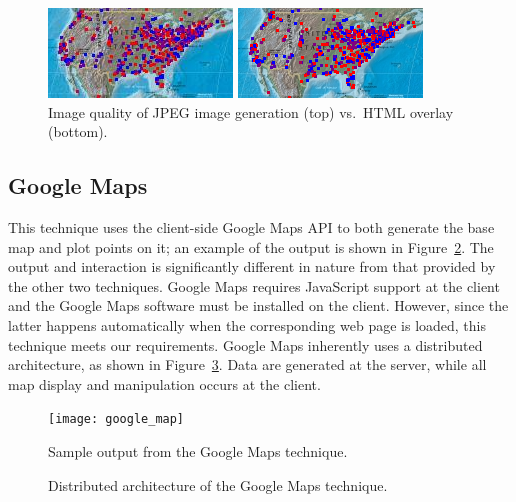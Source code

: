 \documentclass[acmtocl,acmnow]{acmtrans2m}
\begin{document}
\begin{figure}
	\begin{center}
		\includegraphics[scale=1.25]{gd_detail}\medskip
		
		\includegraphics[scale=1.25]{html_detail}
	\end{center}
	\caption{Image quality of JPEG image generation (top) vs.\ HTML
	overlay (bottom).}
	\label{fig-image-quality}
\end{figure}


\subsection{Google Maps}
\label{sec-google}

This technique uses the client-side Google Maps API
\cite{Goog-M-2006-maps} to both generate the base map and plot points on
it; an example of the output is shown in Figure~\ref{fig-google}. The
output and interaction is significantly different in nature from that
provided by the other two techniques. Google Maps requires JavaScript
support at the client and the Google Maps software must be installed on
the client. However, since the latter happens automatically when the
corresponding web page is loaded, this technique meets our requirements.
Google Maps inherently uses a distributed architecture, as shown in
Figure~\ref{fig-google-architecture}. Data are generated at the server,
while all map display and manipulation occurs at the client.


\begin{figure}
	\begin{center}
		\texttt{[image: google\_map]}
	\end{center}
	\caption{Sample output from the Google Maps technique.}
	\label{fig-google}
\end{figure}


\begin{figure}
	\caption{Distributed architecture of the Google Maps technique.}
	\label{fig-google-architecture}
\end{figure}
\end{document}
